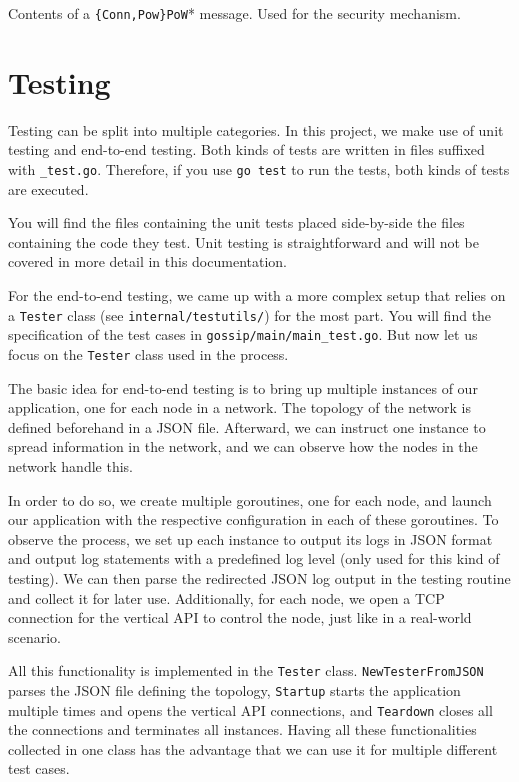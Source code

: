 \documentclass[a4paper,english,10pt,NET]{tumarticle}
\begin{document}
\begin{table}
	\centering
	
	\caption{
		Contents of a \texttt{\{Conn,Pow\}PoW}* message.
		Used for the security mechanism.
	}
	\label{tab:pow}
\end{table}

\section{Testing} \label{sec:testing}
Testing can be split into multiple categories.
In this project, we make use of unit testing and end-to-end testing.
Both kinds of tests are written in files suffixed with \texttt{\_test.go}.
Therefore, if you use \lstinline{go test} to run the tests, both kinds of tests are executed.

You will find the files containing the unit tests placed side-by-side the files containing the code they test.
Unit testing is straightforward and will not be covered in more detail in this documentation.

For the end-to-end testing, we came up with a more complex setup that relies on a \texttt{Tester} class (see \texttt{internal/testutils/}) for the most part.
You will find the specification of the test cases in \texttt{gossip/main/main\_test.go}.
But now let us focus on the \texttt{Tester} class used in the process.

The basic idea for end-to-end testing is to bring up multiple instances of our application, one for each node in a network.
The topology of the network is defined beforehand in a JSON file.
Afterward, we can instruct one instance to spread information in the network, and we can observe how the nodes in the network handle this.

In order to do so, we create multiple goroutines, one for each node, and launch our application with the respective configuration in each of these goroutines.
To observe the process, we set up each instance to output its logs in JSON format and output log statements with a predefined log level (only used for this kind of testing).
We can then parse the redirected JSON log output in the testing routine and collect it for later use.
Additionally, for each node, we open a TCP connection for the vertical API to control the node, just like in a real-world scenario.

All this functionality is implemented in the \texttt{Tester} class.
\texttt{NewTesterFromJSON} parses the JSON file defining the topology,
\texttt{Startup} starts the application multiple times and opens the vertical API connections, and
\texttt{Teardown} closes all the connections and terminates all instances.
Having all these functionalities collected in one class has the advantage that we can use it for multiple different test cases.
\end{document}
